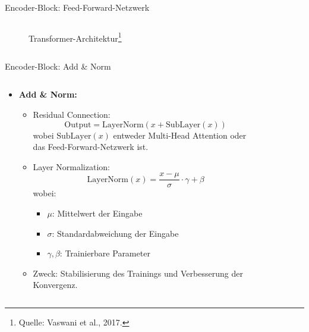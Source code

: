 \documentclass[aspectratio=1610, xcolor=dvipsnames, 9pt]{beamer}
\begin{document}
\begin{frame}{Encoder-Block: Feed-Forward-Netzwerk}
\begin{columns}
\begin{column}{0.3\textwidth}
\begin{figure}
        \caption{Transformer-Architektur\footnote{Quelle: Vaswani et al., 2017.}}
      \end{figure}
    \end{column}
  \end{columns}
\end{frame}

\begin{frame}{Encoder-Block: Add \& Norm}
  \begin{columns}
    \begin{column}{0.7\textwidth}
      \begin{itemize}
        \item \textbf{Add \& Norm:}
          \begin{itemize}
            \item Residual Connection:
              \[
              \text{Output} = \text{LayerNorm}(x + \text{SubLayer}(x))
              \]
              wobei \( \text{SubLayer}(x) \) entweder Multi-Head Attention oder das Feed-Forward-Netzwerk ist.
            \item Layer Normalization:
              \[
              \text{LayerNorm}(x) = \frac{x - \mu}{\sigma} \cdot \gamma + \beta
              \]
              wobei:
              \begin{itemize}
                \item \( \mu \): Mittelwert der Eingabe
                \item \( \sigma \): Standardabweichung der Eingabe
                \item \( \gamma, \beta \): Trainierbare Parameter
              \end{itemize}
            \item Zweck: Stabilisierung des Trainings und Verbesserung der Konvergenz.
          \end{itemize}
      \end{itemize}
    \end{column}
    \begin{column}{0.3\textwidth}
      \begin{figure}
        \centering

\end{figure}
\end{column}
\end{columns}
\end{frame}
\end{document}
